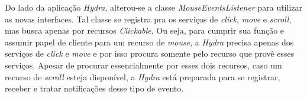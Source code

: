 Do lado da aplicação \emph{Hydra}, alterou-se a classe \emph{MouseEventsListener} para utilizar as novas interfaces. Tal classe se registra pra os serviços de \emph{click}, \emph{move} e \emph{scroll}, mas busca apenas por recursos \emph{Clickable}. Ou seja, para cumprir sua função e assumir papel de cliente para um recurso de \emph{mouse}, a \emph{Hydra} precisa apenas dos serviços de \emph{click} e \emph{move} e por isso procura somente pelo recurso que provê esses serviços. Apesar de procurar essencialmente por esses dois recursos, caso um recurso de \emph{scroll} esteja disponível, a \emph{Hydra} está preparada para se registrar, receber e tratar notificações desse tipo de evento.
 
